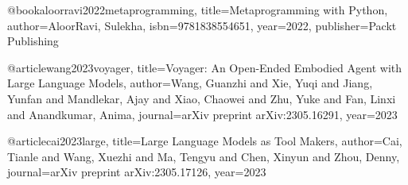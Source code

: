 @book{aloorravi2022metaprogramming,
  title={Metaprogramming with Python},
  author={AloorRavi, Sulekha},
  isbn={9781838554651},
  year={2022},
  publisher={Packt Publishing}
}

@article{wang2023voyager,
  title={Voyager: An Open-Ended Embodied Agent with Large Language Models},
  author={Wang, Guanzhi and Xie, Yuqi and Jiang, Yunfan and Mandlekar, Ajay and Xiao, Chaowei and Zhu, Yuke and Fan, Linxi and Anandkumar, Anima},
  journal={arXiv preprint arXiv:2305.16291},
  year={2023}
}

@article{cai2023large,
  title={Large Language Models as Tool Makers},
  author={Cai, Tianle and Wang, Xuezhi and Ma, Tengyu and Chen, Xinyun and Zhou, Denny},
  journal={arXiv preprint arXiv:2305.17126},
  year={2023}
}
